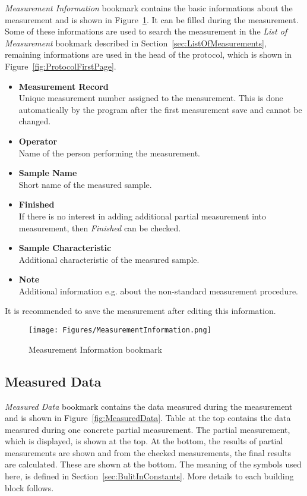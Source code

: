 \documentclass[a4paper,11pt,oneside]{report}
\theoremstyle{named}
\begin{document}
\textit{Measurement Information} bookmark contains the basic informations about the
measurement and is shown in Figure~\ref{fig:MeasurementInformation}. It can be
filled during the measurement. Some of these informations are used to search the
measurement in the \textit{List of Measurement} bookmark described in
Section~\ref{sec:ListOfMeasurements}, remaining informations are used in the
head of the protocol, which is shown in Figure~\ref{fig:ProtocolFirstPage}. 

\begin{itemize}
  \item \textbf{Measurement Record} \\
    Unique measurement number assigned to the measurement. This is done
    automatically by the program after the first measurement save and cannot be
    changed.
  \item \textbf{Operator} \\
    Name of the person performing the measurement. 
  \item \textbf{Sample Name} \\
    Short name of the measured sample.
  \item \textbf{Finished} \\
    If there is no interest in adding additional partial measurement into
    measurement, then \textit{Finished} can be checked.
  \item \textbf{Sample Characteristic} \\
    Additional characteristic of the measured sample.
  \item \textbf{Note} \\
    Additional information e.g. about the non-standard measurement procedure.
\end{itemize}

It is recommended to save the measurement after editing this information. 

\begin{figure}[t]
  \centering
  \texttt{[image: Figures/MeasurementInformation.png]}
  \caption{Measurement Information bookmark}
  \label{fig:MeasurementInformation}
\end{figure}

\subsection{Measured Data}
\label{sec:MeasuredData}

\textit{Measured Data} bookmark contains the data measured during the measurement and is
shown in Figure~\ref{fig:MeasuredData}. Table at the top contains the data
measured during one concrete partial measurement. The partial
measurement, which is displayed, is shown at the top. At the bottom, the results
of partial measurements are shown and from the checked measurements, the
final results are calculated. These are shown at the bottom. The meaning of the symbols
used here, is defined in Section~\ref{sec:BulitInConstants}. More details to each building
block follows.
\end{document}

